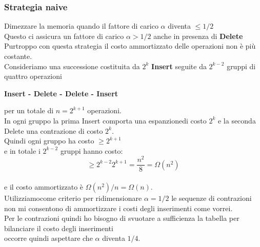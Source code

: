 \subsubsection{Strategia naive}
Dimezzare la memoria quando il fattore di carico $\alpha$ diventa $\le 1/2$\\
Questo ci assicura un fattore di carico $\alpha > 1/2$ anche in presenza di \textbf{Delete}\\
Purtroppo con questa strategia il costo ammortizzato delle operazioni non è più costante.\\
Consideriamo una successione costituita da $2^k$ \textbf{Insert} seguite da $2^{k-2}$ gruppi di quattro operazioni\\
\begin{center}
    \textbf{Insert - Delete - Delete - Insert}
\end{center}
per un totale di \textbf{$n=2^{k+1}$} operazioni.\\
In ogni gruppo la prima Insert comporta una espanzionedi costo $2^k$ e la seconda Delete una contrazione di costo $2^
k$.\\
Quindi ogni gruppo ha costo $\ge 2^{k+1}$\\
e in totale i $2^{k-2}$ gruppi hanno costo:
$$\ge 2^{k-2}2^{k+1}=\frac{n^2}{8}=\Omega(n^2)$$\\
e il costo ammortizzato è \textbf{$\Omega(n^2)/n=\Omega(n)$}.\\
Utilizziamocome criterio per ridimensionare $\alpha=1/2$ le sequenze di contrazioni non mi consentono di ammortizzare i costi degli inserimenti come vorrei.\\
Per le contrazioni quindi ho bisogno di svuotare a sufficienza la tabella per bilanciare il costo degli inserimenti\\
occorre quindi aspettare che $\alpha$ diventa $1/4$.
